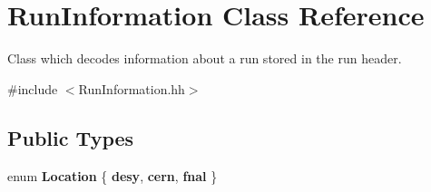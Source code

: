 \section{RunInformation Class Reference}
\label{classRunInformation}


Class which decodes information about a run stored in the run header.  


{\ttfamily \#include $<$RunInformation.hh$>$}\subsection*{Public Types}
\begin{DoxyCompactItemize}
\item 
enum {\bfseries Location} \{ {\bfseries desy}, 
{\bfseries cern}, 
{\bfseries fnal}
 \}
\end{DoxyCompactItemize}
